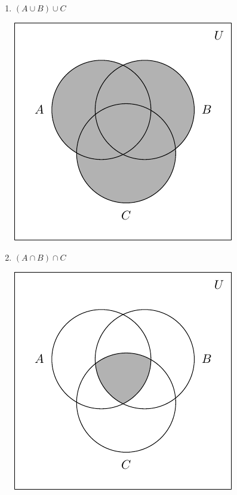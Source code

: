 \documentclass[11pt]{article}
\theoremstyle{definition}  %
\newcounter{HW}
\begin{document}
\begin{multicols}{2}
\begin{enumerate}
\setcounter{enumi}{\value{HW}}


\item $(A \cup B) \cup C$

\includegraphics{SetTheory-42}


\item $(A \cap B) \cap C$

\includegraphics{SetTheory-43}



\setcounter{HW}{\value{enumi}}
\end{enumerate}
\end{multicols}
\end{document}
